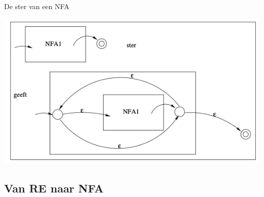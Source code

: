 \begin{pro}{De ster van een NFA}
\begin{minipage}{.56\textwidth}
    \end{minipage}
    \begin{minipage}{.4\textwidth}
        \includegraphics[scale = 0.325]{Images/SterNFA}
    \end{minipage}
\end{pro}

\subsection{Van RE naar NFA}

\vspace{0.5cm}

